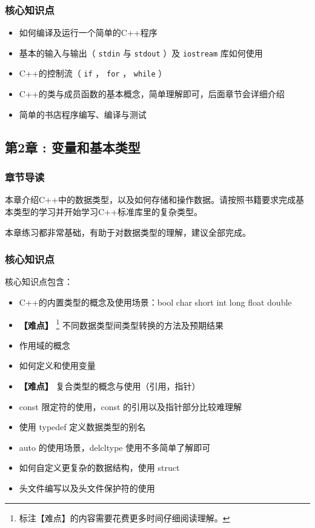 \documentclass[11pt]{article}
\begin{document}
\subsubsection{核心知识点}
\label{sec:orgheadline8}
\begin{itemize}
\item 如何编译及运行一个简单的C++程序
\item 基本的输入与输出（ \texttt{stdin} 与  \texttt{stdout} ）及 \texttt{iostream} 库如何使用
\item C++的控制流（ \texttt{if} ， \texttt{for} ， \texttt{while} ）
\item C++的类与成员函数的基本概念，简单理解即可，后面章节会详细介绍
\item 简单的书店程序编写、编译与测试
\end{itemize}

\subsection{第2章 : 变量和基本类型}
\label{sec:orgheadline12}

\subsubsection{章节导读}
\label{sec:orgheadline10}

本章介绍C++中的数据类型，以及如何存储和操作数据。请按照书籍要求完成基本类型的学习并开始学习C++标准库里的复杂类型。

本章练习都非常基础，有助于对数据类型的理解，建议全部完成。

\subsubsection{核心知识点}
\label{sec:orgheadline11}

核心知识点包含：

\begin{itemize}
\item C++的内置类型的概念及使用场景：bool char short int long float double
\item \textbf{【难点】} \footnote{标注【难点】的内容需要花费更多时间仔细阅读理解。} 不同数据类型间类型转换的方法及预期结果
\item 作用域的概念
\item 如何定义和使用变量
\item \textbf{【难点】}  复合类型的概念与使用（引用，指针）
\item const 限定符的使用，const 的引用以及指针部分比较难理解
\item 使用 typedef 定义数据类型的别名
\item auto 的使用场景，delcltype 使用不多简单了解即可
\item 如何自定义更复杂的数据结构，使用 struct
\item 头文件编写以及头文件保护符的使用
\end{itemize}
\end{document}

